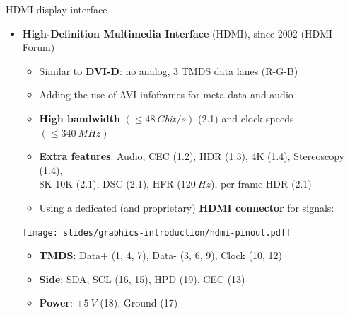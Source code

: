 \begin{frame}{HDMI display interface}
  \begin{itemize}
  \item \textbf{High-Definition Multimedia Interface} (HDMI), since 2002 (HDMI Forum)
    \begin{itemize}
    \item Similar to \textbf{DVI-D}: no analog, 3 TMDS data lanes (R-G-B)
    \item Adding the use of AVI infoframes for meta-data and audio
    \item \textbf{High bandwidth} \((\leq 48~Gbit/s)\) (2.1) and clock speeds \((\leq 340~MHz)\)
    \item \textbf{Extra features}: Audio, CEC (1.2), HDR (1.3), 4K (1.4), Stereoscopy (1.4),\\8K-10K (2.1), DSC (2.1), HFR (\(120~Hz\)), per-frame HDR (2.1)
    \item Using a dedicated (and proprietary) \textbf{HDMI connector} for signals:
    \end{itemize}
  \begin{center}
    \texttt{[image: slides/graphics-introduction/hdmi-pinout.pdf]}
  \end{center}
  \begin{itemize}
  \item \textbf{TMDS}: Data+ {\footnotesize(1, 4, 7)}, Data- {\footnotesize(3, 6, 9)}, Clock {\footnotesize(10, 12)}
  \item \textbf{Side}: SDA, SCL {\footnotesize(16, 15)}, HPD {\footnotesize(19)}, CEC {\footnotesize(13)}
  \item \textbf{Power}: \(+5~V\) {\footnotesize(18)}, Ground {\footnotesize(17)}
  \end{itemize}
  \end{itemize}
\end{frame}

